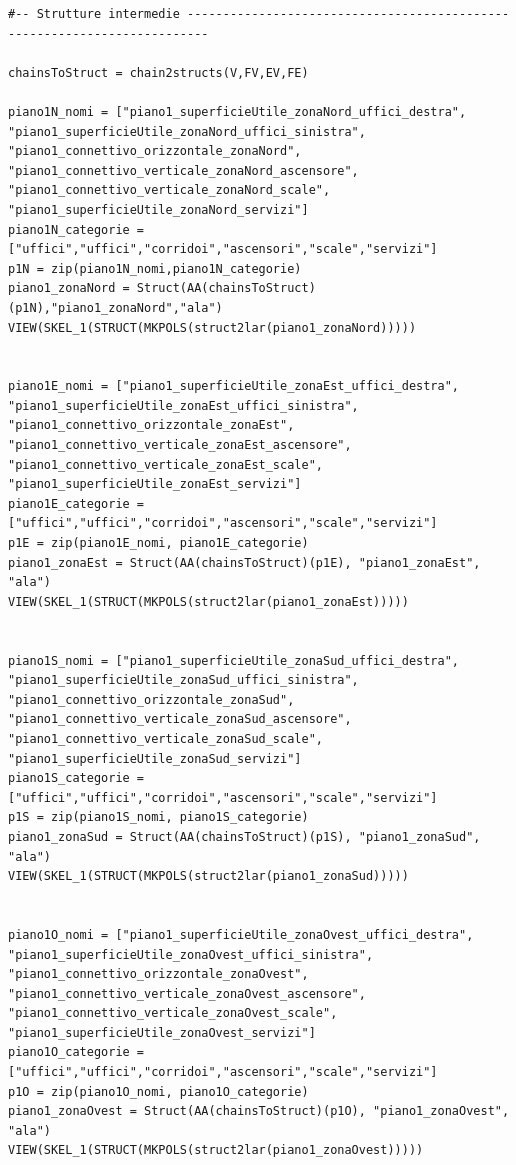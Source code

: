\documentclass[11pt, oneside]{article}   	%
\begin{document}
\begin{verbatim}
#-- Strutture intermedie -------------------------------------------------------------------------

chainsToStruct = chain2structs(V,FV,EV,FE)

piano1N_nomi = ["piano1_superficieUtile_zonaNord_uffici_destra", "piano1_superficieUtile_zonaNord_uffici_sinistra", "piano1_connettivo_orizzontale_zonaNord", "piano1_connettivo_verticale_zonaNord_ascensore", "piano1_connettivo_verticale_zonaNord_scale", "piano1_superficieUtile_zonaNord_servizi"]
piano1N_categorie = ["uffici","uffici","corridoi","ascensori","scale","servizi"]
p1N = zip(piano1N_nomi,piano1N_categorie)
piano1_zonaNord = Struct(AA(chainsToStruct)(p1N),"piano1_zonaNord","ala")
VIEW(SKEL_1(STRUCT(MKPOLS(struct2lar(piano1_zonaNord)))))


piano1E_nomi = ["piano1_superficieUtile_zonaEst_uffici_destra", "piano1_superficieUtile_zonaEst_uffici_sinistra", "piano1_connettivo_orizzontale_zonaEst", "piano1_connettivo_verticale_zonaEst_ascensore", "piano1_connettivo_verticale_zonaEst_scale", "piano1_superficieUtile_zonaEst_servizi"]
piano1E_categorie = ["uffici","uffici","corridoi","ascensori","scale","servizi"]
p1E = zip(piano1E_nomi, piano1E_categorie)
piano1_zonaEst = Struct(AA(chainsToStruct)(p1E), "piano1_zonaEst", "ala")
VIEW(SKEL_1(STRUCT(MKPOLS(struct2lar(piano1_zonaEst)))))


piano1S_nomi = ["piano1_superficieUtile_zonaSud_uffici_destra", "piano1_superficieUtile_zonaSud_uffici_sinistra", "piano1_connettivo_orizzontale_zonaSud", "piano1_connettivo_verticale_zonaSud_ascensore", "piano1_connettivo_verticale_zonaSud_scale", "piano1_superficieUtile_zonaSud_servizi"]
piano1S_categorie = ["uffici","uffici","corridoi","ascensori","scale","servizi"]
p1S = zip(piano1S_nomi, piano1S_categorie)
piano1_zonaSud = Struct(AA(chainsToStruct)(p1S), "piano1_zonaSud", "ala")
VIEW(SKEL_1(STRUCT(MKPOLS(struct2lar(piano1_zonaSud)))))


piano1O_nomi = ["piano1_superficieUtile_zonaOvest_uffici_destra", "piano1_superficieUtile_zonaOvest_uffici_sinistra", "piano1_connettivo_orizzontale_zonaOvest", "piano1_connettivo_verticale_zonaOvest_ascensore", "piano1_connettivo_verticale_zonaOvest_scale", "piano1_superficieUtile_zonaOvest_servizi"]
piano1O_categorie = ["uffici","uffici","corridoi","ascensori","scale","servizi"]
p1O = zip(piano1O_nomi, piano1O_categorie)
piano1_zonaOvest = Struct(AA(chainsToStruct)(p1O), "piano1_zonaOvest", "ala")
VIEW(SKEL_1(STRUCT(MKPOLS(struct2lar(piano1_zonaOvest)))))



\end{verbatim}
\end{document}
